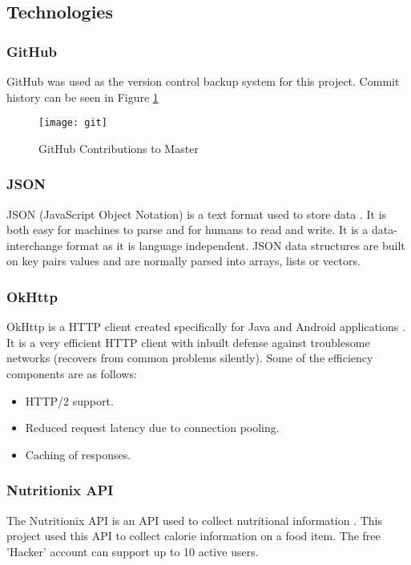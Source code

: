 \tocless\subsection{Technologies}

\tocless\subsubsection{GitHub}
GitHub was used as the version control backup system for this project.
Commit history can be seen in Figure \ref{fig:git}

\begin{figure}[h]
    \texttt{[image: git]}
    \caption{GitHub Contributions to Master}
    \label{fig:git}
\end{figure}

\tocless\subsubsection{JSON}
JSON (JavaScript Object Notation) is a text format used to store data \parencite{json}.
It is both easy for machines to parse and for humans to read and write.
It is a data-interchange format as it is language independent.
JSON data structures are built on key pairs values and are normally parsed into arrays, lists or vectors.

\tocless\subsubsection{OkHttp}
OkHttp is a HTTP client created specifically for Java and Android applications \parencite{okhttp}.
It is a very efficient HTTP client with inbuilt defense against troublesome networks (recovers from common problems silently).
Some of the efficiency components are as follows:
\begin{itemize}
    \item{HTTP/2 support.}
    \item{Reduced request latency due to connection pooling.}
    \item{Caching of responses.}
\end{itemize}

\tocless\subsubsection{Nutritionix API}
The Nutritionix API is an API used to collect nutritional information \parencite{nutritionix}.
This project used this API to collect calorie information on a food item.
The free 'Hacker' account can support up to 10 active users.

